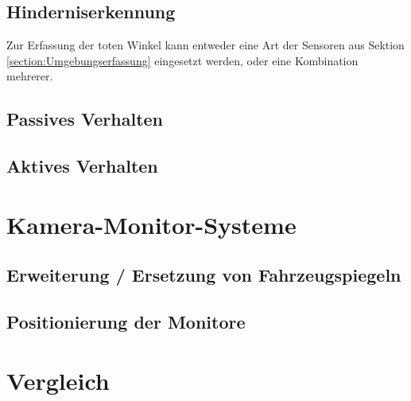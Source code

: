 		\subsection{Hinderniserkennung}\label{section:Hinderniserkennung}
			Zur Erfassung der toten Winkel kann entweder eine Art der Sensoren aus Sektion \ref{section:Umgebungserfassung} eingesetzt werden, oder eine Kombination mehrerer. 
			
		\subsection{Passives Verhalten}\label{section:PassivesVerhalten}
		\subsection{Aktives Verhalten}\label{section:AktivesVerhalten}
	\section{Kamera-Monitor-Systeme}
		\subsection{Erweiterung / Ersetzung von Fahrzeugspiegeln}
		\subsection{Positionierung der Monitore}
	\section{Vergleich}
